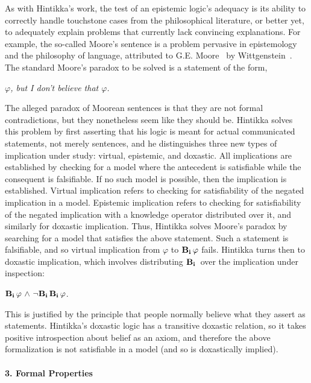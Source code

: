 As with Hintikka's work, the test of an epistemic logic's adequacy is its ability to correctly handle touchstone cases from the philosophical literature, or better yet, to adequately explain problems that currently lack convincing explanations. For example, the so-called Moore's sentence is a problem pervasive in epistemology and the philosophy of language, attributed to G.E. Moore~\cite{Moore} by Wittgenstein~\cite{Wittgenstein}. The standard Moore's paradox to be solved is a statement of the form,
\begin{center}
	\emph{$\varphi$, but I don't believe that $\varphi$.}
\end{center}

The alleged paradox of Moorean sentences is that they are not formal contradictions, but they nonetheless seem like they should be. Hintikka solves this problem by first asserting that his logic is meant for actual communicated statements, not merely sentences, and he distinguishes three new types of implication under study: virtual, epistemic, and doxastic. All implications are established by checking for a model where the antecedent is satisfiable while the consequent is falsifiable. If no such model is possible, then the implication is established. Virtual implication refers to checking for satisfiability of the negated implication in a model. Epistemic implication refers to checking for satisfiability of the negated implication with a knowledge operator distributed over it, and similarly for doxastic implication. Thus, Hintikka solves Moore's paradox by searching for a model that satisfies the above statement. Such a statement is falsifiable, and so virtual implication from $\varphi$ to $\mathbf{B}_{\mathbf{i}}\,\varphi$ fails. Hintikka turns then to doxastic implication, which involves distributing $\mathbf{B}_{\mathbf{i}}\,$ over the implication under inspection:
\begin{center}
	$\mathbf{B}_{\mathbf{i}}\,\varphi {\ \wedge \ } {\neg} \mathbf{B}_{\mathbf{i}}\,\mathbf{B}_{\mathbf{i}}\,\varphi$.
\end{center}

This is justified by the principle that people normally believe what they assert as statements. Hintikka's doxastic logic has a transitive doxastic relation, so it takes positive introspection about belief as an axiom, and therefore the above formalization is not satisfiable in a model (and so is doxastically implied). 

\paragraph{3. Formal Properties}

